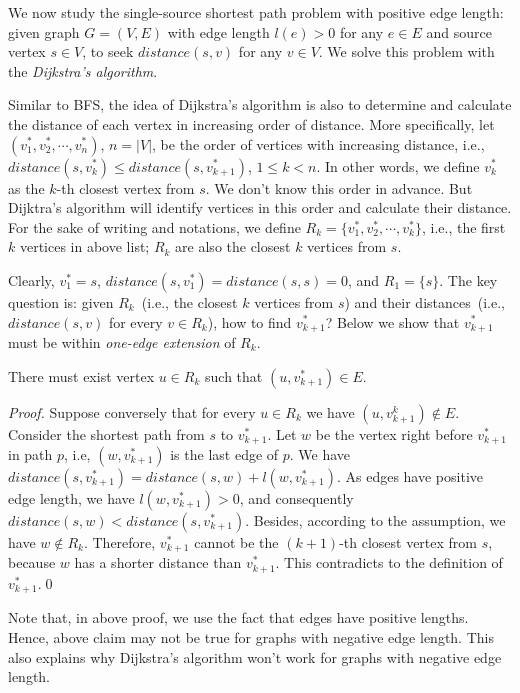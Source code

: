 We now study the single-source shortest path problem with positive edge length:
given graph $G = (V, E)$ with edge length $l(e) > 0$ for any $e\in E$ and
source vertex $s\in V$, to seek $distance(s, v)$ for any $v\in V$.
We solve this problem with the \emph{Dijkstra's algorithm}.

Similar to BFS, the idea of Dijkstra's algorithm is also to
determine and calculate the distance of each vertex
in increasing order of distance.
More specifically, let $(v_1^*, v_2^*, \cdots, v_n^*)$, $n = |V|$,
be the order of vertices with increasing distance, i.e., $distance(s, v_k^*) \le distance(s, v_{k+1}^*)$, $1\le k < n$.
In other words, we define $v_k^*$ as the $k$-th closest vertex from $s$.
We don't know this order in advance.
But Dijktra's algorithm will identify vertices in this order and calculate
their distance.
For the sake of writing and notations, we define $R_k = \{v_1^*, v_2^*, \cdots, v_k^*\}$, i.e., 
the first $k$ vertices in above list; $R_k$ are also the closest $k$ vertices from $s$.

Clearly, $v_1^* = s$, $distance(s, v_1^*) = distance(s, s) = 0$, and $R_1 = \{s\}$.
The key question is: given $R_k$~(i.e., the closest $k$ vertices from $s$) and their distances~(i.e., $distance(s, v)$ for every $v\in R_k$),
how to find $v_{k + 1}^*$?
Below we show that $v_{k + 1}^*$ must be within \emph{one-edge extension} of $R_k$.
\begin{claim}
There must exist vertex $u\in R_k$ such that $(u, v_{k+1}^*) \in E$.
\end{claim}
\emph{Proof.} Suppose conversely that for every $u\in R_k$ we have $(u, v_{k+1}^k)\not\in E$.
Consider the shortest path from $s$ to $v_{k+1}^*$.
Let $w$ be the vertex right before $v_{k+1}^*$ in path $p$, i.e, $(w, v_{k+1}^*)$ is the last edge of $p$.
We have $distance(s, v_{k+1}^*) = distance(s, w) + l(w, v_{k+1}^*)$. %
As edges have positive edge length, we have $l(w, v_{k+1}^*) > 0$, and consequently
$distance(s, w) < distance(s, v_{k+1}^*)$.
Besides, according to the assumption, we have $w\not\in R_k$.
Therefore, $v_{k+1}^*$ cannot be the $(k+1)$-th closest vertex from $s$,
because $w$ has a shorter distance than $v_{k+1}^*$. This contradicts to the definition of $v_{k+1}^*$.\qed

Note that, in above proof, we use the fact that edges have positive lengths.
Hence, above claim may not be true for graphs with negative edge length.
This also explains why Dijkstra's algorithm won't work for graphs with negative edge length.


